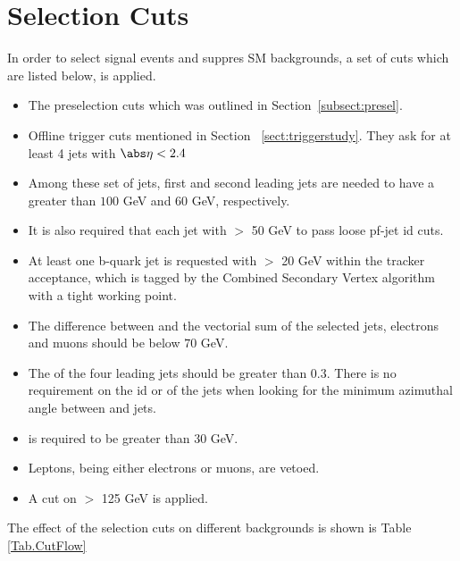 \section{Selection Cuts}
\label{sect:cuts}


In order to select signal events and suppres SM backgrounds, a set of cuts which are listed below, is applied.
\begin{itemize}
\item The preselection cuts which was outlined in Section~\ref{subsect:presel}.
\item Offline trigger cuts mentioned in Section ~\ref{sect:triggerstudy}. They ask for at least 4 jets with $\abs\eta<2.4$
\item Among these set of jets, first and second leading jets are needed to have a \pT greater than $100$ GeV and $60$ GeV, respectively.
\item It is also required that each jet with \pT $>$ 50 GeV to pass loose pf-jet id cuts.
\item At least one b-quark jet is requested with \pT $>$ 20 GeV within the tracker acceptance, which is tagged by the Combined Secondary Vertex algorithm with a tight working point.
\item The difference between \met and the vectorial \pT sum of the selected jets, electrons and muons should be below $70$ GeV.
\item The \mindphifour of the four leading jets should be greater than 0.3. There is no requirement on the id or \pT of the jets when looking for the minimum azimuthal angle between \met and jets. 
\item \met is required to be greater than $30$ GeV. 
\item Leptons, being either electrons or muons, are vetoed.
\item A cut on \mttwo $>$ 125 GeV is applied.
\end{itemize}

The effect of the selection cuts on different backgrounds is shown is Table \ref{Tab.CutFlow}

